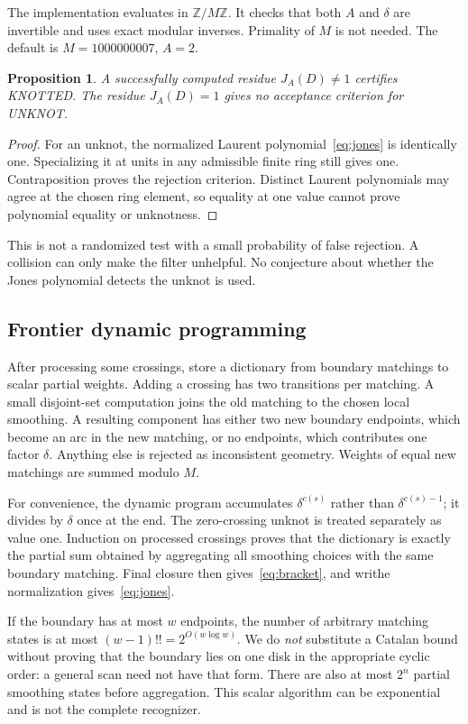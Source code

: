 \documentclass[11pt]{article}
\newtheorem{proposition}[theorem]{Proposition}
\theoremstyle{definition}\newtheorem{definition}[theorem]{Definition}
\theoremstyle{remark}\newtheorem{remark}[theorem]{Remark}
\newcommand{\UNK}{\textsf{UNKNOT}}
\newcommand{\KNOT}{\textsf{KNOTTED}}
\begin{document}
The implementation evaluates in $\mathbb Z/M\mathbb Z$. It checks that both
$A$ and $\delta$ are invertible and uses exact modular inverses. Primality of
$M$ is not needed. The default is $M=1000000007$, $A=2$.

\begin{proposition}\label{prop:jones}
A successfully computed residue $J_A(D)\ne1$ certifies \KNOT. The residue
$J_A(D)=1$ gives no acceptance criterion for \UNK.
\end{proposition}
\begin{proof}
For an unknot, the normalized Laurent polynomial~\eqref{eq:jones} is
identically one. Specializing it at units in any admissible finite ring still
gives one. Contraposition proves the rejection criterion. Distinct Laurent
polynomials may agree at the chosen ring element, so equality at one value
cannot prove polynomial equality or unknotness.
\end{proof}

This is not a randomized test with a small probability of false rejection.
A collision can only make the filter unhelpful. No conjecture about whether
the Jones polynomial detects the unknot is used.

\subsection{Frontier dynamic programming}

After processing some crossings, store a dictionary from boundary matchings
to scalar partial weights. Adding a crossing has two transitions per matching.
A small disjoint-set computation joins the old matching to the chosen local
smoothing. A resulting component has either two new boundary endpoints,
which become an arc in the new matching, or no endpoints, which contributes
one factor $\delta$. Anything else is rejected as inconsistent geometry.
Weights of equal new matchings are summed modulo $M$.

For convenience, the dynamic program accumulates $\delta^{c(s)}$ rather than
$\delta^{c(s)-1}$; it divides by $\delta$ once at the end. The zero-crossing
unknot is treated separately as value one. Induction on processed crossings
proves that the dictionary is exactly the partial sum obtained by aggregating
all smoothing choices with the same boundary matching. Final closure then
gives~\eqref{eq:bracket}, and writhe normalization gives~\eqref{eq:jones}.

If the boundary has at most $w$ endpoints, the number of arbitrary matching
states is at most $(w-1)!!=2^{O(w\log w)}$. We do \emph{not} substitute a
Catalan bound without proving that the boundary lies on one disk in the
appropriate cyclic order: a general scan need not have that form. There are
also at most $2^n$ partial smoothing states before aggregation. This scalar
algorithm can be exponential and is not the complete recognizer.
\end{document}

